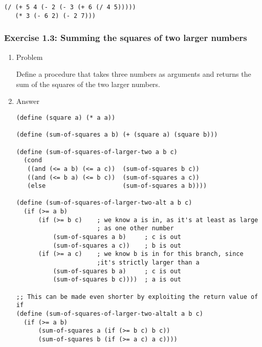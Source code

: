 \documentclass[11pt]{article}
\begin{document}
\begin{verbatim}
(/ (+ 5 4 (- 2 (- 3 (+ 6 (/ 4 5)))))
   (* 3 (- 6 2) (- 2 7)))
\end{verbatim}
\subsubsection{Exercise 1.3: Summing the squares of two larger numbers}
\label{sec-1-1-3}
\begin{enumerate}
\item Problem
\label{sec-1-1-3-1}

Define a procedure that takes three numbers as arguments and
returns the sum of the squares of the two larger numbers.
\item Answer
\label{sec-1-1-3-2}

\begin{verbatim}
(define (square a) (* a a))

(define (sum-of-squares a b) (+ (square a) (square b)))

(define (sum-of-squares-of-larger-two a b c)
  (cond
   ((and (<= a b) (<= a c))  (sum-of-squares b c))
   ((and (<= b a) (<= b c))  (sum-of-squares a c))
   (else                     (sum-of-squares a b))))

(define (sum-of-squares-of-larger-two-alt a b c)
  (if (>= a b)
      (if (>= b c)    ; we know a is in, as it's at least as large
                      ; as one other number
          (sum-of-squares a b)     ; c is out
          (sum-of-squares a c))    ; b is out
      (if (>= a c)    ; we know b is in for this branch, since
                      ;it's strictly larger than a
          (sum-of-squares b a)     ; c is out
          (sum-of-squares b c))))  ; a is out

;; This can be made even shorter by exploiting the return value of if
(define (sum-of-squares-of-larger-two-altalt a b c)
  (if (>= a b)
      (sum-of-squares a (if (>= b c) b c))
      (sum-of-squares b (if (>= a c) a c))))
\end{verbatim}
\end{enumerate}
\end{document}
